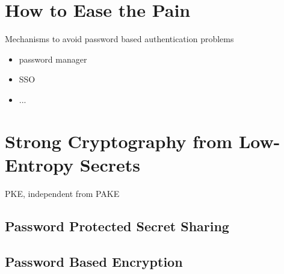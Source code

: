 
\section{How to Ease the Pain}
Mechanisms to avoid password based authentication problems
\begin{itemize}
	\item password manager
	\item SSO
	\item ...
\end{itemize}


\section{Strong Cryptography from Low-Entropy Secrets}
PKE, independent from PAKE

\subsection{Password Protected Secret Sharing}

\subsection{Password Based Encryption}

